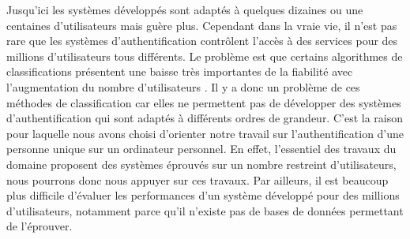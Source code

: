 Jusqu'ici les systèmes développés sont adaptés à quelques dizaines ou une centaines d'utilisateurs mais guère plus. Cependant dans la vraie vie, il n'est pas rare que les systèmes d'authentification contrôlent l'accès à des services pour des millions d'utilisateurs tous différents. Le problème est que certains algorithmes de classifications présentent une baisse très importantes de la fiabilité avec l'augmentation du nombre d'utilisateurs \cite{panasiuk2016}. Il y a donc un problème de ces méthodes de classification car elles ne permettent pas de développer des systèmes d'authentification qui sont adaptés à différents ordres de grandeur. C'est la raison pour laquelle nous avons choisi d'orienter notre travail sur l'authentification d'une personne unique sur un ordinateur personnel. En effet, l'essentiel des travaux du domaine proposent des systèmes éprouvés sur un nombre restreint d'utilisateurs, nous pourrons donc nous appuyer sur ces travaux. Par ailleurs, il est beaucoup plus difficile d'évaluer les performances d'un système développé pour des millions d'utilisateurs, notamment parce qu'il n'existe pas de bases de données permettant de l'éprouver.